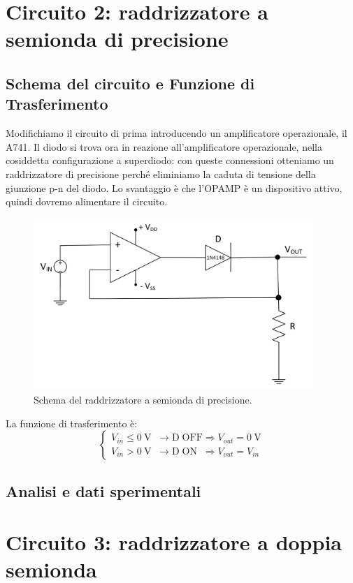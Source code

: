 \documentclass{report}
\begin{document}
\section{Circuito 2: raddrizzatore a semionda di precisione}
\subsection{Schema del circuito e Funzione di Trasferimento}
Modifichiamo il circuito di prima introducendo un amplificatore operazionale, il \textmu A741. Il diodo si trova ora in reazione all'amplificatore operazionale, nella cosiddetta configurazione a superdiodo: con queste connessioni otteniamo un raddrizzatore di precisione perché eliminiamo la caduta di tensione della giunzione p-n del diodo. Lo svantaggio è che l'OPAMP è un dispositivo attivo, quindi dovremo alimentare il circuito.\par
\begin{figure}[h]
	\centering
	\includegraphics[height=6.5cm]{immagini/schema2}
	\caption{Schema del raddrizzatore a semionda di precisione.}
	\label{figura:schema2}
\end{figure}
\noindent La funzione di trasferimento è:
\begin{equation}
   \begin{cases}
   V_{in}\le \SI{0}{\volt}\;\;\rightarrow \mathrm{D\;OFF} \Rightarrow V_{out} =\SI{0}{\volt}\\
   V_{in}> \SI{0}{\volt}\;\;\rightarrow \mathrm{D\;ON}\;\; \Rightarrow V_{out} = V_{in}
   \end{cases}
\end{equation}
\subsection{Analisi e dati sperimentali}

\newpage
\section{Circuito 3: raddrizzatore a doppia semionda}
\end{document}
